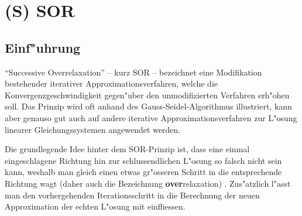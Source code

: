\chapter{(S) SOR\label{chapter:sor}}
\begin{refsection}


\section{Einf"uhrung}
``Successive Overrelaxation''
\cite{Watkins:FundamentalsOfMatrixComputations} -- kurz SOR -- bezeichnet eine
Modifikation bestehender iterativer Approximationsverfahren, welche
die Konvergenzgeschwindigkeit gegen"uber den unmodifizierten Verfahren
erh"ohen soll. Das Prinzip wird oft anhand des Gauss-Seidel-Algorithmus
illustriert, kann aber genauso gut auch auf andere iterative
Approximationsverfahren zur L"osung linearer Gleichungssystemen angewendet
werden.

Die grundlegende Idee hinter dem SOR-Prinzip ist, dass eine einmal
eingeschlagene Richtung hin zur schlussendlichen L"osung so falsch
nicht sein kann, weshalb man gleich einen etwas gr"osseren Schritt
in die entsprechende Richtung wagt (daher auch die Bezeichnung
\textbf{over}relaxation) \cite{SOR_Dorn}. Zus"atzlich l"asst man den
vorhergehenden
Iterationsschritt in die Berechnung der neuen Approximation der echten
L"osung mit einfliessen.


\end{refsection}
